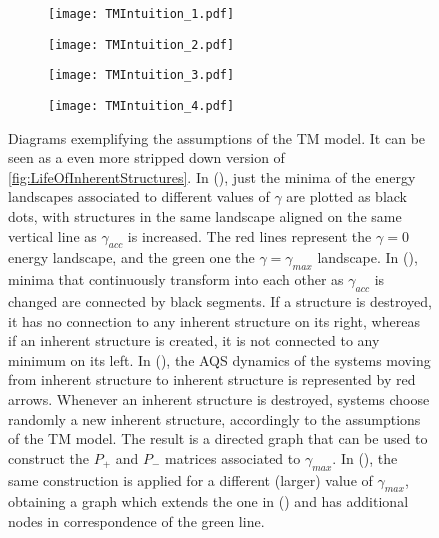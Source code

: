 \begin{figure}
	\centering
	\begin{subfigure}[b]{0.45\textwidth}
		\centering
		\texttt{[image: TMIntuition\_1.pdf]}
		\caption{\label{fig:TMIntuitionBare}}
	\end{subfigure}
	\centering
	\begin{subfigure}[b]{0.45\textwidth}
		\centering
		\texttt{[image: TMIntuition\_2.pdf]}
		\caption{\label{fig:TMIntuitionInherent}}
	\end{subfigure}
	\centering
	\begin{subfigure}[b]{0.45\textwidth}
		\centering
		\texttt{[image: TMIntuition\_3.pdf]}
		\caption{\label{fig:TMIntuitionAQS}}
	\end{subfigure}
	\begin{subfigure}[b]{0.45\textwidth}
		\centering
		\texttt{[image: TMIntuition\_4.pdf]}
		\caption{\label{fig:TMIntuitionAQSMore}}
	\end{subfigure} 	
\caption{Diagrams exemplifying the assumptions of the TM model. It can be seen as a even more stripped down version of \autoref{fig:LifeOfInherentStructures}. In (), just the minima of the energy landscapes associated to different values of $\gamma$ are plotted as black dots, with structures in the same landscape aligned on the same vertical line as $\gamma_{acc}$ is increased. The red lines represent the $\gamma = 0$ energy landscape, and the green one the $\gamma = \gamma_{max}$ landscape. In (), minima that continuously transform into each other as $\gamma_{acc}$ is changed are connected by black segments. If a structure is destroyed, it has no connection to any inherent structure on its right, whereas if an inherent structure is created, it is not connected to any minimum on its left. In (), the AQS dynamics of the systems moving from inherent structure to inherent structure is represented by red arrows. Whenever an inherent structure is destroyed, systems choose randomly a new inherent structure, accordingly to the assumptions of the TM model. The result is a directed graph that can be used to construct the $P_{+}$ and $P_{-}$ matrices associated to $\gamma_{max}$. In (), the same construction is applied for a different (larger) value of $\gamma_{max}$, obtaining a graph which extends the one in () and has additional nodes in correspondence of the green line. \label{fig:TMIntuition}}
\end{figure}

